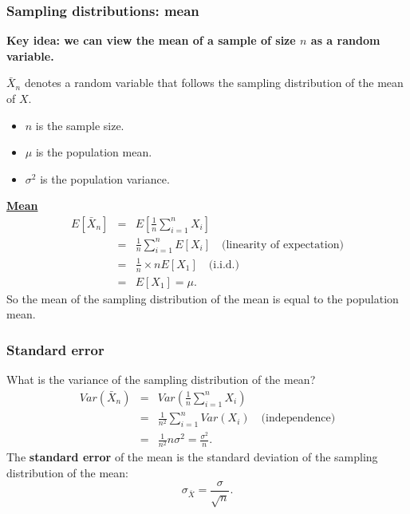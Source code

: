 \documentclass[t,8pt]{beamer}
\begin{document}
\begin{frame}
\begin{center}
	\end{center}
\end{frame}

\begin{frame}
	\frametitle{Sampling distributions: mean}
	{\bf Key idea: we can view the mean of a sample of size $n$ as a random variable.} \par
	$\bar X_n$ denotes a random variable that follows the sampling distribution of the mean of $X$.
	\begin{itemize}
		\item $n$ is the sample size.
		\item $\mu$ is the population mean.
		\item $\sigma^2$ is the population variance.
	\end{itemize}
	{\bf\underline{Mean}}
	\begin{eqnarray*}
		E[\bar X_n]
		&=&E\left[\frac{1}{n}\sum_{i=1}^n X_i\right]\\
		&=&\frac{1}{n}\sum_{i=1}^n E[X_i] \quad\text{(linearity of expectation)}\\
		&=&\frac{1}{n}\times nE[X_1] \quad\text{(i.i.d.)}\\
		&=&E[X_1]=\mu.
	\end{eqnarray*}
	So the mean of the sampling distribution of the mean is equal to the population mean.
\end{frame}

\begin{frame}
	\frametitle{Standard error}
	What is the variance of the sampling distribution of the mean?
	\begin{eqnarray*}
		Var(\bar X_n)
		&=&Var\left(\frac{1}{n}\sum_{i=1}^n X_i\right)\\
		&=&\frac{1}{n^2}\sum_{i=1}^nVar(X_i)
		\quad\text{(independence)}\\
		&=&\frac{1}{n^2}n\sigma^2=\frac{\sigma^2}{n}.
	\end{eqnarray*}
	The {\bf standard error} of the mean is the standard deviation of the sampling distribution of the mean:
	\[
	\sigma_{\bar X}=\frac{\sigma}{\sqrt{n}}.
	\]
\end{frame}
\end{document}
